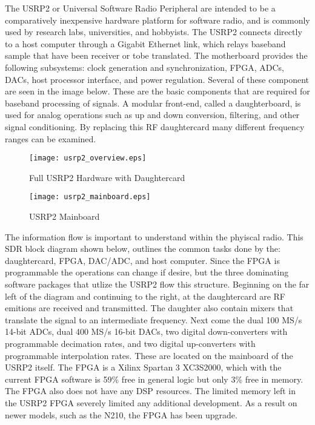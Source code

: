 The USRP2 or Universal Software Radio Peripheral are intended to be a comparatively inexpensive hardware platform for software radio, and is commonly used by research labs, universities, and hobbyists\cite{wired}.  The USRP2 connects directly to a host computer through a Gigabit Ethernet link, which relays baseband sample that have been receiver or tobe translated.   The motherboard provides the following subsystems: clock generation and synchronization, FPGA, ADCs, DACs, host processor interface, and power regulation. Several of these component are seen in the image below.  These are the basic components that are required for baseband processing of signals. A modular front-end, called a daughterboard, is used for analog operations such as up and down conversion, filtering, and other signal conditioning. By replacing this RF daughtercard many different frequency ranges can be examined.\\

\begin{figure}\label{usrp2_full_hardware}
\centering
\texttt{[image: usrp2\_overview.eps]}
\caption{Full USRP2 Hardware with Daughtercard}
\end{figure}

\begin{figure}\label{usrp2_mainboard}
\centering
\texttt{[image: usrp2\_mainboard.eps]}
\caption{USRP2 Mainboard}
\end{figure}


The information flow is important to understand within the phyiscal radio.  This SDR block diagram shown below, outlines the common tasks done by the: daughtercard, FPGA, DAC/ADC, and host computer.  Since the FPGA is programmable the operations can change if desire, but the three dominating software packages that utlize the USRP2 flow this structure.  Beginning on the far left of the diagram and continuing to the right, at the daughtercard are RF emitions are received and transmitted.  The daughter also contain mixers that translate the signal to an intermediate frequency.  Next come the dual 100 MS/s 14-bit ADCs, dual 400 MS/s 16-bit DACs, two digital down-converters with programmable decimation rates, and two digital up-converters with programmable interpolation rates\cite{USRP2Stats}.  These are located on the mainboard of the USRP2 itself.  The FPGA is a Xilinx Spartan 3 XC3S2000, which with the current FPGA software is 59\% free in general logic but only 3\% free in memory.  The FPGA also does not have any DSP resources.  The limited memory left in the USRP2 FPGA severely limited any additional development.  As a result on newer models, such as the N210, the FPGA has been upgrade.\cite{n210spec}\\

